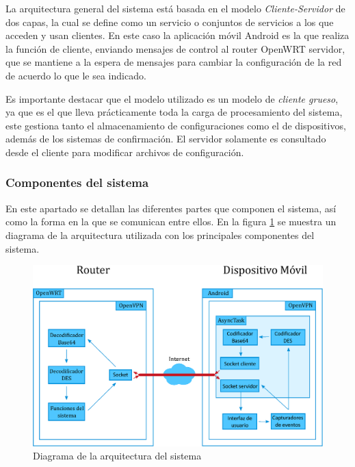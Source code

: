\documentclass[12pt, twoside]{article}
\begin{document}
        La arquitectura general del sistema está basada en el modelo \textit{Cliente-Servidor} de dos capas, la cual se define como un servicio o conjuntos de servicios a los que acceden y usan clientes. En este caso la aplicación móvil Android es la que realiza la función de cliente, enviando mensajes de control al router OpenWRT servidor, que se mantiene a la espera de mensajes para cambiar la configuración de la red de acuerdo lo que le sea indicado.

        Es importante destacar que el modelo utilizado es un modelo de \textit{cliente grueso}, ya que es el que lleva prácticamente toda la carga de procesamiento del sistema, este gestiona tanto el almacenamiento de configuraciones como el de dispositivos, además de los sistemas de confirmación. El servidor solamente es consultado desde el cliente para modificar archivos de configuración.

        \subsubsection{Componentes del sistema}
            En este apartado se detallan las diferentes partes que componen el sistema, así como la forma en la que se comunican entre ellos. En la figura \ref{fig:system_diagram} se muestra un diagrama de la arquitectura utilizada con los principales componentes del sistema.

            \begin{figure}[h!]
            \centering
                \includegraphics[scale=0.5]{system_diagram.eps}
                \caption{Diagrama de la arquitectura del sistema}
                \label{fig:system_diagram}
            \end{figure}
\end{document}
